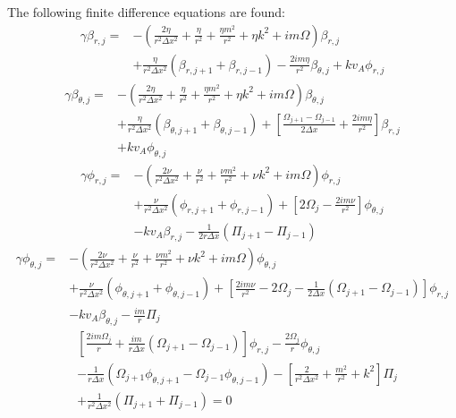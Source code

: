 \documentclass[letterpaper]{article}
\begin{document}
The following finite difference equations are found:
\begin{align}
\gamma\beta_{r, j} = &-(\frac{2\eta}{r^2 \Delta x^2} + \frac{\eta}{r^2} + \frac{\eta m^2}{r^2} + \eta k^2 + im\Omega )\beta_{r, j}
\\ \nonumber
&+\frac{\eta}{r^2 \Delta x^2}(\beta_{r, j+1} + \beta_{r, j-1}) - \frac{2im \eta}{r^2}\beta_{\theta,j} + k v_A \phi_{r,j}
\end{align}
\begin{align}
\gamma\beta_{\theta,j}=&-(\frac{2\eta}{r^2 \Delta x^2} + \frac{\eta}{r^2} + \frac{\eta m^2}{r^2} + \eta k^2 + im\Omega)\beta_{\theta, j}
\\ \nonumber
&+\frac{\eta}{r^2 \Delta x^2}(\beta_{\theta, j+1} + \beta_{\theta, j-1}) +\left[\frac{\Omega_{j+1}-\Omega_{j-1}}{2\Delta x} + \frac{2im\eta}{r^2}\right]\beta_{r,j}
\\ \nonumber
&+kv_A\phi_{\theta,j}
\end{align}
\begin{align}
\gamma\phi_{r, j} = &-(\frac{2\nu}{r^2 \Delta x^2} + \frac{\nu}{r^2} + \frac{\nu m^2}{r^2} + \nu k^2 + im\Omega)\phi_{r, j}
\\ \nonumber
&+\frac{\nu}{r^2 \Delta x^2}(\phi_{r, j+1} + \phi_{r, j-1}) + \left[2\Omega_{j}-\frac{2im\nu}{r^2} \right]\phi_{\theta, j} 
\\ \nonumber
& - kv_A\beta_{r,j} - \frac{1}{2 r \Delta x}\left(\Pi_{j+1}-\Pi_{j-1}\right)
\end{align}
\begin{align}
\gamma\phi_{\theta, j} = &-(\frac{2\nu}{r^2 \Delta x^2} + \frac{\nu}{r^2} + \frac{\nu m^2}{r^2} + \nu k^2 + im\Omega)\phi_{\theta, j}
\\ \nonumber
&+\frac{\nu}{r^2 \Delta x^2}(\phi_{\theta, j+1} + \phi_{\theta, j-1}) + \left[\frac{2im\nu}{r^2} - 2\Omega_j - \frac{1}{2\Delta x}\left(\Omega_{j+1}-\Omega_{j-1}\right)\right]\phi_{r,j}
\\ \nonumber
& - kv_A \beta_{\theta, j} - \frac{im}{r}\Pi_{j}
\end{align}
\begin{align}
&\left[\frac{2im\Omega_j}{r} + \frac{im}{r\Delta x}(\Omega_{j+1}-\Omega_{j-1})\right]\phi_{r,j} - \frac{2\Omega_j}{r}\phi_{\theta,j} 
\\ \nonumber
&- \frac{1}{r\Delta x}\left(\Omega_{j+1}\phi_{\theta,j+1}-\Omega_{j-1}\phi_{\theta,j-1}\right) - \left[\frac{2}{r^2\Delta x^2} + \frac{m^2}{r^2}+k^2\right]\Pi_{j}
\\ \nonumber
&+\frac{1}{r^2\Delta x^2}\left(\Pi_{j+1} + \Pi_{j-1}\right) = 0
\end{align}
\end{document}

